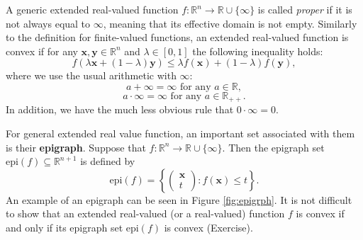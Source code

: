 \documentclass[10pt,a4paper]{article}
\begin{document}
A generic extended real-valued function $f : \mathbb{R}^n \to \mathbb{R} \cup \{\infty\}$ is called \emph{proper} if it is not always equal to $\infty$, meaning that its effective domain is not empty. Similarly to the definition for finite-valued functions, an extended real-valued function is convex if for any $\mathbf{x}, \mathbf{y} \in \mathbb{R}^n$ and $\lambda \in [0,1]$ the following inequality holds:
\begin{equation*}
	f(\lambda \mathbf{x} + (1-\lambda)\mathbf{y}) \leq \lambda f(\mathbf{x}) + (1-\lambda)f(\mathbf{y}),
\end{equation*}
where we use the usual arithmetic with $\infty$:
\begin{equation*}
	a + \infty = \infty \text{ for any } a \in \mathbb{R},
\end{equation*}
\begin{equation*}
	a \cdot \infty = \infty \text{ for any } a \in \mathbb{R}_{++}.
\end{equation*}
In addition, we have the much less obvious rule that $0 \cdot \infty = 0$. 

For general extended real value function, an important set associated with them is their \textbf{epigraph}. Suppose that $f : \mathbb{R}^n \to \mathbb{R} \cup \{\infty\}$. Then the epigraph set $\text{epi}(f) \subseteq \mathbb{R}^{n+1}$ is defined by
\begin{equation*}
	\text{epi}(f) = \left\{ \begin{pmatrix} \mathbf{x} \\ t \end{pmatrix} : f(\mathbf{x}) \leq t \right\}.
\end{equation*}
\noindent An example of an epigraph can be seen in Figure \ref{fig:epigrph}. It is not difficult to show that an extended real-valued (or a real-valued) function $f$ is convex if and only if its epigraph set $\text{epi}(f)$ is convex (Exercise). 
\end{document}
